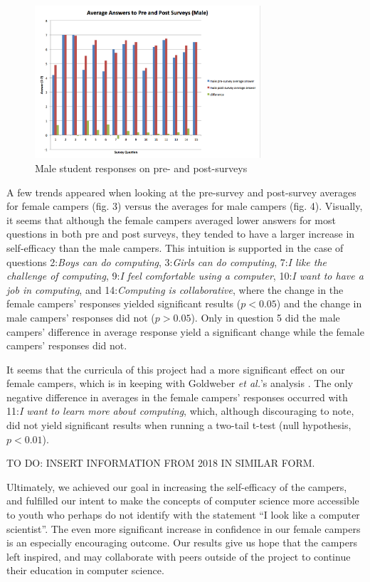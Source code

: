 \begin{figure}
\includegraphics[width=3.3in]{images/AvgAnswersMale}
\caption{Male student responses on pre- and post-surveys}
\end{figure}

A few trends appeared when looking at the pre-survey and post-survey
averages for female campers (fig. 3) versus the averages for male
campers (fig. 4). Visually, it seems that although the female
campers averaged lower answers for most questions in both pre and
post surveys, they tended to have a larger increase in self-efficacy
than the male campers. This intuition is supported in the case of
questions 2:\textit{Boys can do computing}, 3:\textit{Girls can do
computing}, 7:\textit{I like the challenge of computing}, 9:\textit{I
feel comfortable using a computer}, 10:\textit{I want to have a job
in computing}, and 14:\textit{Computing is collaborative}, where
the change in the female campers' responses yielded significant
results ($p < 0.05$) and the change in male campers' responses did
not ($p > 0.05$). Only in question 5 did the male campers' difference
in average response yield a significant change while the female
campers' responses did not.

It seems that the curricula of this project had a more significant
effect on our female campers, which is in keeping with Goldweber
\textit{et al.}'s analysis \cite{Goldweber2013}.  The only negative
difference in averages in the female campers' responses occurred
with 11:\textit{I want to learn more about computing}, which,
although discouraging to note, did not yield significant results
when running a two-tail t-test (null hypothesis, $p < 0.01$).

TO DO: INSERT INFORMATION FROM 2018 IN SIMILAR FORM.

Ultimately, we achieved our goal in increasing the self-efficacy
of the campers, and fulfilled our intent to make the concepts of
computer science more accessible to youth who perhaps do not identify
with the statement ``I look like a computer scientist''. The even
more significant increase in confidence in our female campers is
an especially encouraging outcome. Our results give us hope that
the campers left inspired, and may collaborate with peers outside
of the project to continue their education in computer science.

